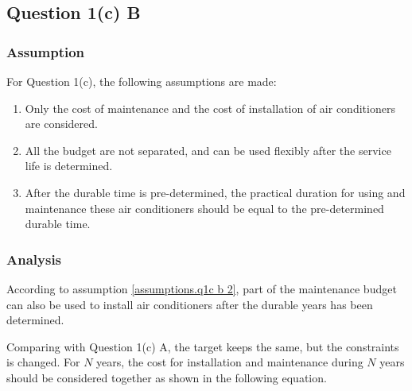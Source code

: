 \documentclass[titlepage,a4paper]{article}
\begin{document}


    \subsection{Question 1(c) B}
    
        \subsubsection{Assumption}

        For Question 1(c), the following assumptions are made:

            \begin{enumerate}
                \item Only the cost of maintenance and the cost of installation of air conditioners are considered.
                \item \label{assumptions.q1c b 2} All the budget are not separated, and can be used flexibly after the service life is determined. 
                \item After the durable time is pre-determined, the practical duration for using and maintenance these air conditioners should  be equal to the pre-determined durable time.
            \end{enumerate}

        \subsubsection{Analysis} \label{analysis.q1c b}
        
        According to assumption \ref{assumptions.q1c b 2}, part of the maintenance budget can also be used to install air conditioners after the durable years has been determined. 

        Comparing with Question 1(c) A, the target keeps the same, but the constraints is changed. For $N$ years, the cost for installation and maintenance during $N$ years should be considered together as shown in the following equation.
\end{document}
